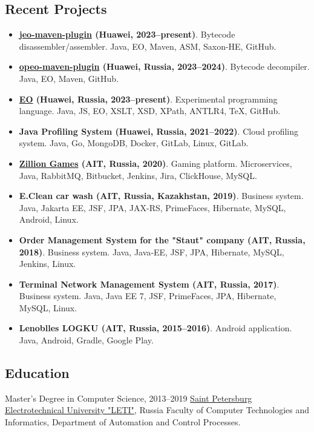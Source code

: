 \documentclass{vl}
\begin{document}
    \subsection*{Recent Projects}

    \begin{itemize}
        \itemsep0em
        \item \textbf{\href{https://github.com/objectionary/jeo-maven-plugin}{jeo-maven-plugin} (Huawei, 2023--present)}. Bytecode disassembler/assembler. Java, EO, Maven, ASM, Saxon-HE, GitHub.
        \item \textbf{\href{https://github.com/objectionary/opeo-maven-plugin}{opeo-maven-plugin} (Huawei, Russia, 2023--2024)}. Bytecode decompiler. Java, EO, Maven, GitHub.
        \item \textbf{\href{https://www.eolang.org}{EO} (Huawei, Russia, 2023--present)}. Experimental programming language. Java, JS, EO, XSLT, XSD, XPath, ANTLR4, TeX, GitHub.
        \item \textbf{Java Profiling System (Huawei, Russia, 2021--2022)}. Cloud profiling system. Java, Go, MongoDB, Docker, GitLab, Linux, GitLab.
        \item \textbf{\href{http://zillion.games/}{Zillion Games} (AIT, Russia, 2020)}. Gaming platform. Microservices, Java, RabbitMQ, Bitbucket, Jenkins, Jira, ClickHouse, MySQL.
        \item \textbf{E.Clean car wash (AIT, Russia, Kazakhstan, 2019)}. Business system. Java, Jakarta EE, JSF, JPA, JAX-RS, PrimeFaces, Hibernate, MySQL, Android, Linux. 
        \item \textbf{Order Management System for the "Staut" company (AIT, Russia, 2018)}. Business system. Java, Java‐EE, JSF, JPA, Hibernate, MySQL, Jenkins, Linux.
        \item \textbf{Terminal Network Management System (AIT, Russia, 2017)}. Business system. Java, Java EE 7, JSF, PrimeFaces, JPA, Hibernate, MySQL, Linux.
        \item \textbf{Lenoblles LOGKU (AIT, Russia, 2015--2016)}. Android application. Java, Android, Gradle, Google Play.
    \end{itemize}

    \subsection*{Education}
    \begin{samepage}
        Master's Degree in Computer Science, 2013--2019\newline
        \href{https://etu.ru/en/university/}{Saint Petersburg Electrotechnical University "LETI"}, Russia\newline
        Faculty of Computer Technologies and Informatics, Department of Automation and Control Processes.
    \end{samepage}
\end{document}
